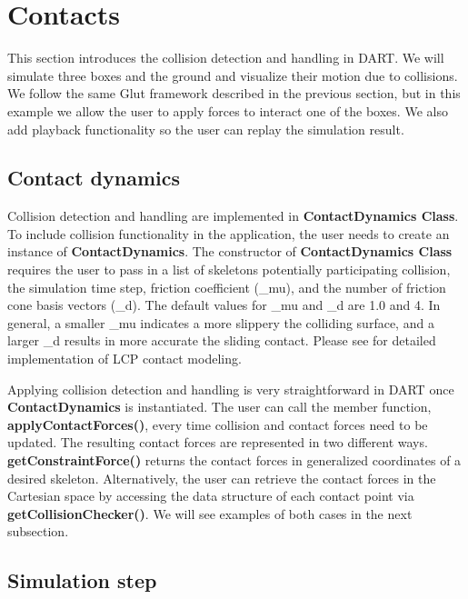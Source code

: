 \section{Contacts}
This section introduces the collision detection and handling in DART. We
will simulate three boxes and the ground and visualize their motion
due to collisions. We follow the same Glut framework described in the
previous section, but in this example we allow the user to apply
forces to interact one of the boxes. We also add playback
functionality so the user can replay the simulation result.

\subsection{Contact dynamics}
Collision detection and handling are implemented in
\textbf{ContactDynamics Class}. To include collision functionality in
the application, the user needs to create an instance of
\textbf{ContactDynamics}. The constructor of \textbf{ContactDynamics
  Class} requires the user to pass in a list of skeletons potentially
participating collision, the simulation time step, friction
coefficient (\_mu), and the number of friction cone basis vectors
(\_d). The default values for \_mu and \_d are 1.0 and 4. In general, a
smaller \_mu indicates a more slippery the colliding surface, and a
larger \_d results in more accurate the sliding contact. Please see
\cite{LCP-tutorial} for detailed implementation of LCP contact
modeling.

Applying collision detection and handling is very straightforward in
DART once \textbf{ContactDynamics} is instantiated. The user can call
the member function, \textbf{applyContactForces()}, every time
collision and contact forces need to be updated. The resulting contact
forces are represented in two different
ways. \textbf{getConstraintForce()} returns the contact forces in
generalized coordinates of a desired skeleton. Alternatively, the user
can retrieve the contact forces in the Cartesian space by accessing
the data structure of each contact point via
\textbf{getCollisionChecker()}. We will see examples of both cases in
the next subsection.

\subsection{Simulation step}

